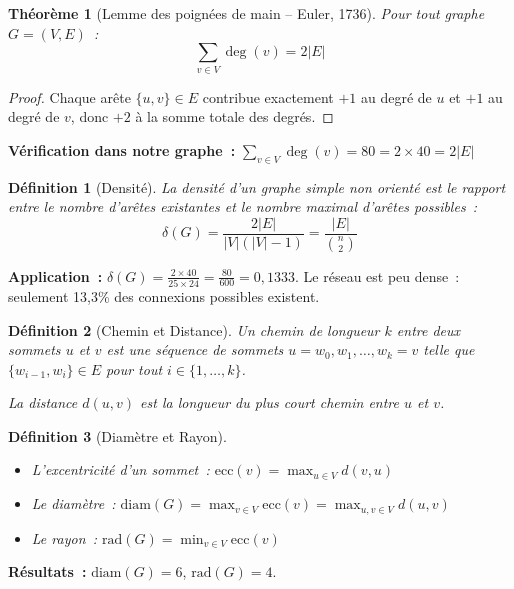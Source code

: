 \documentclass[12pt,a4paper]{article}
\newtheorem{definition}{Définition}[section]
\newtheorem{theoreme}{Théorème}[section]
\begin{document}
\begin{theoreme}[Lemme des poignées de main -- Euler, 1736]
Pour tout graphe $G = (V, E)$~:
\[
    \sum_{v \in V} \deg(v) = 2|E|
\]
\end{theoreme}

\begin{proof}
Chaque arête $\{u, v\} \in E$ contribue exactement $+1$ au degré de $u$ et $+1$ au degré de $v$, donc $+2$ à la somme totale des degrés.
\end{proof}

\noindent \textbf{Vérification dans notre graphe~:} $\sum_{v \in V} \deg(v) = 80 = 2 \times 40 = 2|E|$ \checkmark

\begin{definition}[Densité]
La \emph{densité} d'un graphe simple non orienté est le rapport entre le nombre d'arêtes existantes et le nombre maximal d'arêtes possibles~:
\[
    \delta(G) = \frac{2|E|}{|V|(|V|-1)} = \frac{|E|}{\binom{n}{2}}
\]
\end{definition}

\noindent \textbf{Application~:} $\delta(G) = \frac{2 \times 40}{25 \times 24} = \frac{80}{600} = 0{,}1333$. Le réseau est peu dense~: seulement 13,3\% des connexions possibles existent.

\begin{definition}[Chemin et Distance]
Un \emph{chemin} de longueur $k$ entre deux sommets $u$ et $v$ est une séquence de sommets $u = w_0, w_1, \ldots, w_k = v$ telle que $\{w_{i-1}, w_i\} \in E$ pour tout $i \in \{1, \ldots, k\}$.

La \emph{distance} $d(u, v)$ est la longueur du plus court chemin entre $u$ et $v$.
\end{definition}

\begin{definition}[Diamètre et Rayon]
\begin{itemize}
    \item L'\emph{excentricité} d'un sommet~: $\text{ecc}(v) = \max_{u \in V} d(v, u)$
    \item Le \emph{diamètre}~: $\text{diam}(G) = \max_{v \in V} \text{ecc}(v) = \max_{u,v \in V} d(u,v)$
    \item Le \emph{rayon}~: $\text{rad}(G) = \min_{v \in V} \text{ecc}(v)$
\end{itemize}
\end{definition}

\noindent \textbf{Résultats~:} $\text{diam}(G) = 6$, $\text{rad}(G) = 4$.
\end{document}
